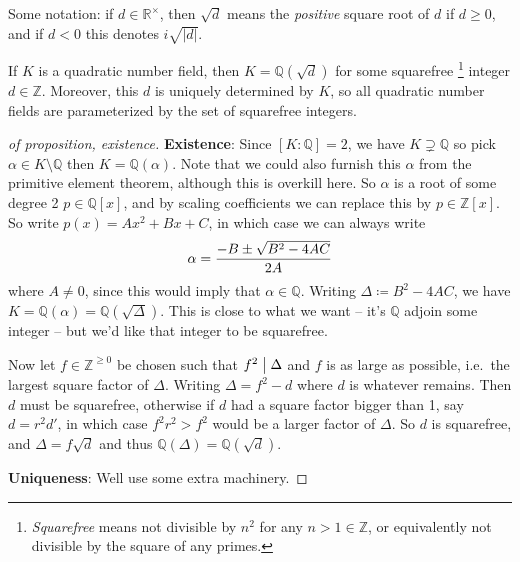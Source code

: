 \begin{remark}

Some notation: if \(d\in {\mathbb{R}}^{\times}\), then \(\sqrt d\) means
the \emph{positive} square root of \(d\) if \(d \geq 0\), and if \(d<0\)
this denotes \(i\sqrt{{\left\lvert {d} \right\rvert}}\).

\end{remark}

\begin{proposition}

If \(K\) is a quadratic number field, then
\(K = {\mathbb{Q}}(\sqrt{d})\) for some squarefree \footnote{\emph{Squarefree}
  means not divisible by \(n^2\) for any \(n > 1\in {\mathbb{Z}}\), or
  equivalently not divisible by the square of any primes.} integer
\(d\in {\mathbb{Z}}\). Moreover, this \(d\) is uniquely determined by
\(K\), so all quadratic number fields are parameterized by the set of
squarefree integers.

\end{proposition}

\begin{proof}[of proposition, existence]

\textbf{Existence}: Since \([K: {\mathbb{Q}}] = 2\), we have
\(K\supsetneq {\mathbb{Q}}\) so pick
\(\alpha\in K\setminus{\mathbb{Q}}\) then \(K = {\mathbb{Q}}(\alpha)\).
Note that we could also furnish this \(\alpha\) from the primitive
element theorem, although this is overkill here. So \(\alpha\) is a root
of some degree 2 \(p\in {\mathbb{Q}}[x]\), and by scaling coefficients
we can replace this by \(p\in {\mathbb{Z}}[x]\). So write
\(p(x) = Ax^2 + Bx + C\), in which case we can always write
\begin{align*}
\alpha = {-B \pm \sqrt{B^2 - 4AC} \over 2A} 
\end{align*}
where \(A\neq 0\), since this would imply that
\(\alpha\in{\mathbb{Q}}\). Writing \(\Delta\coloneqq B^2 - 4AC\), we
have \(K = {\mathbb{Q}}(\alpha) = {\mathbb{Q}}(\sqrt{\Delta})\). This is
close to what we want -- it's \({\mathbb{Q}}\) adjoin some integer --
but we'd like that integer to be squarefree.

\hfill\break

Now let \(f\in {\mathbb{Z}}^{\geq 0}\) be chosen such that
\(f^2 \bigm|\Delta\) and \(f\) is as large as possible, i.e.~the largest
square factor of \(\Delta\). Writing \(\Delta = f^2 - d\) where \(d\) is
whatever remains. Then \(d\) must be squarefree, otherwise if \(d\) had
a square factor bigger than 1, say \(d = r^2 d'\), in which case
\(f^2 r^2 > f^2\) would be a larger factor of \(\Delta\). So \(d\) is
squarefree, and \(\Delta = f \sqrt d\) and thus
\({\mathbb{Q}}(\Delta) = {\mathbb{Q}}(\sqrt{d})\).

\textbf{Uniqueness}: Well use some extra machinery.

\end{proof}

